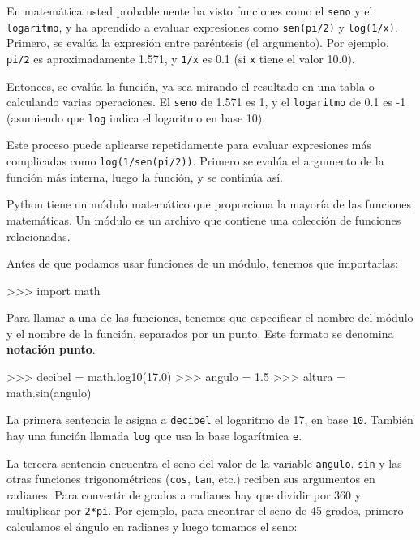  

En matemática usted probablemente ha visto funciones como el \texttt{seno}
y el \texttt{logaritmo}, y ha aprendido a evaluar expresiones como
\texttt{sen(pi/2)} y \texttt{log(1/x)}. Primero, se evalúa la expresión
entre paréntesis (el argumento). Por ejemplo, \texttt{pi/2} es aproximadamente
1.571, y \texttt{1/x} es 0.1 (si \texttt{x} tiene el valor 10.0).

Entonces, se evalúa la función, ya sea mirando el resultado en una
tabla o calculando varias operaciones. El \texttt{seno} de 1.571 es
1, y el \texttt{logaritmo} de 0.1 es -1 (asumiendo que \texttt{log}
indica el logaritmo en base 10).

Este proceso puede aplicarse repetidamente para evaluar expresiones
más complicadas como \texttt{log(1/sen(pi/2))}. Primero se evalúa
el argumento de la función más interna, luego la función, y se continúa
así.

Python tiene un módulo matemático que proporciona la mayoría de las
funciones matemáticas. Un módulo es un archivo que contiene una colección
de funciones relacionadas.


Antes de que podamos usar funciones de un módulo, tenemos que importarlas:

\begin{pyconcode}
>>> import math
\end{pyconcode}
 Para llamar a una de las funciones, tenemos que especificar el nombre
del módulo y el nombre de la función, separados por un punto. Este
formato se denomina \textbf{notación punto}.


\begin{pyconcode}
>>> decibel = math.log10(17.0)
>>> angulo = 1.5
>>> altura = math.sin(angulo)
\end{pyconcode}
 La primera sentencia le asigna a \texttt{decibel} el logaritmo de
17, en base \texttt{10}. También hay una función llamada \texttt{log}
que usa la base logarítmica \texttt{e}.

La tercera sentencia encuentra el seno del valor de la variable \texttt{angulo}.
\texttt{sin} y las otras funciones trigonométricas (\texttt{cos},
\texttt{tan}, etc.) reciben sus argumentos en radianes. Para convertir
de grados a radianes hay que dividir por 360 y multiplicar por \texttt{2{*}pi}.
Por ejemplo, para encontrar el seno de 45 grados, primero calculamos
el ángulo en radianes y luego tomamos el seno:

